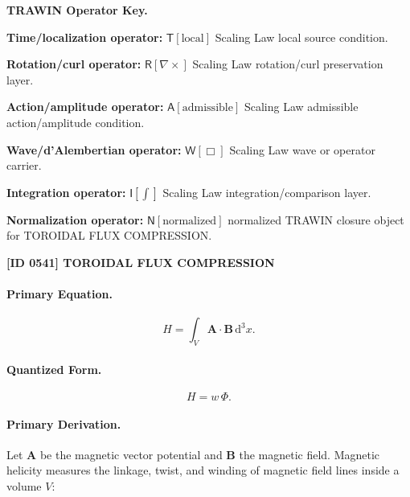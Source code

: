\par\vspace{0.45\baselineskip}
\noindent\begin{minipage}[t]{\linewidth}
\begingroup
\small
\raggedright
\textbf{TRAWIN Operator Key.}\par
\noindent\textbf{Time/localization operator:} $\mathsf{T}\!\left[\mathrm{local}\right]$ Scaling Law local source condition.\par
\noindent\textbf{Rotation/curl operator:} $\mathsf{R}\!\left[\nabla\times\right]$ Scaling Law rotation/curl preservation layer.\par
\noindent\textbf{Action/amplitude operator:} $\mathsf{A}\!\left[\mathrm{admissible}\right]$ Scaling Law admissible action/amplitude condition.\par
\noindent\textbf{Wave/d'Alembertian operator:} $\mathsf{W}\!\left[\Box\right]$ Scaling Law wave or operator carrier.\par
\noindent\textbf{Integration operator:} $\mathsf{I}\!\left[\int\right]$ Scaling Law integration/comparison layer.\par
\noindent\textbf{Normalization operator:} $\mathsf{N}\!\left[\mathrm{normalized}\right]$ normalized TRAWIN closure object for TOROIDAL FLUX COMPRESSION.\par
\endgroup
\end{minipage}

\clearpage
\noindent\textbf{[ID 0541] TOROIDAL FLUX COMPRESSION}\par
\vspace{0.35em}
\paragraph{Primary Equation.}
\begin{equation}
H
=
\int_V
\mathbf{A}\cdot\mathbf{B}
\,\mathrm{d}^3x .
\end{equation}

\paragraph{Quantized Form.}
\begin{equation}
H=w\,\Phi .
\end{equation}

\paragraph{Primary Derivation.}
Let $\mathbf{A}$ be the magnetic vector potential and $\mathbf{B}$ the magnetic field.  
Magnetic helicity measures the linkage, twist, and winding of magnetic field lines inside a volume $V$:

